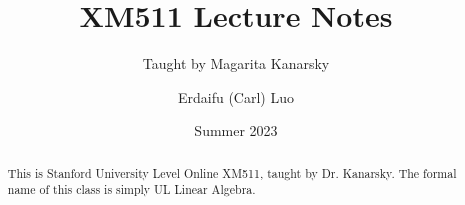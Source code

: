 \documentclass[oneside, 11pt]{scrartcl}
\title{XM511 Lecture Notes}
\subtitle{Taught by Magarita Kanarsky}
\author{Erdaifu (Carl) Luo}
\date{Summer 2023}
\begin{document}
  \maketitle
  \begin{abstract}
    This is Stanford University Level Online XM511, taught by Dr. Kanarsky.
    The formal name of this class is simply UL Linear Algebra.
  \end{abstract}
  \tableofcontents
  \newpage
  
  
  
  
  
  
  
  
\end{document}
